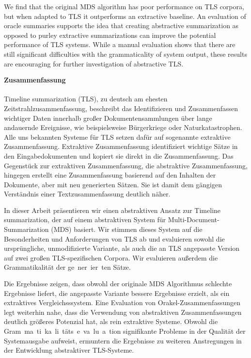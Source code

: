 \documentclass[a4paper,BCOR=10mm]{report}
\numberwithin{lemma}{chapter}
\numberwithin{definition}{chapter}
\begin{document}
\begin{titlepage}
We find that the original MDS algorithm has poor performance on TLS corpora, but when adapted to TLS it outperforms an extractive baseline.
An evaluation of oracle summaries supports the idea that creating abstractive summarization as opposed to purley extractive summarizations can improve the potential performance of TLS systems.
While a manual evaluation shows that there are still significant difficulties with the grammaticality of system output, these results are encouraging for further investigation of abstractive TLS.

\newpage
\noindent
\large\textbf{Zusammenfassung}\\
\\

Timeline summarization (TLS), zu deutsch am ehesten Zeitstrahlzusammenfassung, beschreibt das Identifizieren und Zusammenfassen wichtiger Daten innerhalb großer Dokumentensammlungen über lange andauernde Ereignisse, wie beispielsweise Bürgerkriege oder Naturkatastrophen.
Alle uns bekannten Systeme für TLS setzen dafür auf sogenannte extraktive Zusammenfassung. Extraktive Zusammenfassung identifiziert wichtige Sätze in den Eingabedokumenten und kopiert sie direkt in die Zusammenfassung. Das Gegenstück zur extraktiven Zusammenfassung, die abstraktive Zusammenfassung, hingegen erstellt eine Zusammenfassung basierend auf den Inhalten der Dokumente, aber mit neu generierten Sätzen. Sie ist damit dem gängigen Verständnis einer Textzusammenfassung deutlich näher.

In dieser Arbeit präsentieren wir einen abstraktiven Ansatz zur Timeline summarization, der auf einem abstraktiven System für Multi-Document-Summarization (MDS) basiert. Wir stimmen dieses System auf die Besonderheiten und Anforderungen von TLS ab und evaluieren sowohl die ursprüngliche, unmodifizierte Variante, als auch die an TLS angepasste Version auf zwei großen TLS-spezifischen Corpora.
Wir evaluieren außerdem die Grammatikalität der ge~ner~ier~ten Sätze.

Die Ergebnisse zeigen, dass obwohl der originale MDS Algorithmus schlechte Ergebnisse liefert, die angepasste Variante bessere Ergebnisse erzielt, als ein extraktives Vergleichsssystem.
Eine Evaluation von Orakel-Zusammenfassungen legt weiterhin nahe, dass die Verwendung von abstraktiven Zusammenfassungen deutlich größeres Potenzial hat, als rein extraktive Systeme.
Obwohl die Gram~ma~ti~ka~li~täts~e~va~lu~a~tion signifikante Probleme in der Qualität der Systemausgabe aufweist, ermuntern die Ergebnisse zu weiteren Anstregungen in der Entwicklung abstraktiver TLS-Systeme. 

\newpage
\normalsize
\tableofcontents

\end{titlepage}
\end{document}
